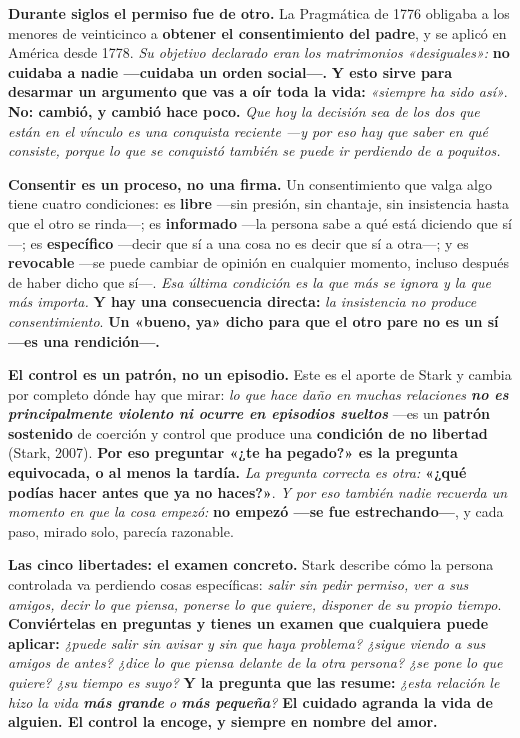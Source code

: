 \documentclass[11pt,letterpaper]{article}
\newcommand{\milcpaso}[3]{%
\Needspace{4\baselineskip}%
\begin{tcolorbox}[enhanced,colback=white,colframe=milcLinea,arc=1.5mm,boxrule=.9pt,
  left=14mm,right=4mm,top=3mm,bottom=3mm,before skip=4pt,after skip=4pt,
  fontupper=\RaggedRight,
  overlay={\node[anchor=north west,circle,fill=#2,text=white,inner sep=0pt,
    minimum size=7.4mm,font=\sffamily\bfseries\small]
    at ([xshift=3.6mm,yshift=-3.2mm]frame.north west) {#1};}]
#3
\end{tcolorbox}}
\begin{document}
\milcpaso{1}{milcTurquesa}{\textbf{Durante siglos el permiso fue de otro.} La Pragmática de 1776 obligaba a los menores de veinticinco a \textbf{obtener el consentimiento del padre}, y se aplicó en América desde 1778. \emph{Su objetivo declarado eran los matrimonios «desiguales»:} \textbf{no cuidaba a nadie ---cuidaba un orden social---.} \textbf{Y esto sirve para desarmar un argumento que vas a oír toda la vida:} \emph{«siempre ha sido así»}. \textbf{No: cambió, y cambió hace poco.} \emph{Que hoy la decisión sea de los dos que están en el vínculo es una conquista reciente ---y por eso hay que saber en qué consiste, porque lo que se conquistó también se puede ir perdiendo de a poquitos.}}
\milcpaso{2}{milcTurquesa}{\textbf{Consentir es un proceso, no una firma.} Un consentimiento que valga algo tiene cuatro condiciones: es \textbf{libre} ---sin presión, sin chantaje, sin insistencia hasta que el otro se rinda---; es \textbf{informado} ---la persona sabe a qué está diciendo que sí---; es \textbf{específico} ---decir que sí a una cosa no es decir que sí a otra---; y es \textbf{revocable} ---se puede cambiar de opinión en cualquier momento, incluso después de haber dicho que sí---. \emph{Esa última condición es la que más se ignora y la que más importa.} \textbf{Y hay una consecuencia directa:} \emph{la insistencia no produce consentimiento}. \textbf{Un «bueno, ya» dicho para que el otro pare no es un sí ---es una rendición---.}}
\milcpaso{3}{milcTurquesa}{\textbf{El control es un patrón, no un episodio.} Este es el aporte de Stark y cambia por completo dónde hay que mirar: \emph{lo que hace daño en muchas relaciones \textbf{no es principalmente violento ni ocurre en episodios sueltos}} ---es un \textbf{patrón sostenido} de coerción y control que produce una \textbf{condición de no libertad} (Stark, 2007). \textbf{Por eso preguntar «¿te ha pegado?» es la pregunta equivocada, o al menos la tardía.} \emph{La pregunta correcta es otra:} \textbf{«¿qué podías hacer antes que ya no haces?»}. \emph{Y por eso también nadie recuerda un momento en que la cosa empezó:} \textbf{no empezó ---se fue estrechando---}, y cada paso, mirado solo, parecía razonable.}
\milcpaso{4}{milcTurquesa}{\textbf{Las cinco libertades: el examen concreto.} Stark describe cómo la persona controlada va perdiendo cosas específicas: \emph{salir sin pedir permiso, ver a sus amigos, decir lo que piensa, ponerse lo que quiere, disponer de su propio tiempo}. \textbf{Conviértelas en preguntas y tienes un examen que cualquiera puede aplicar:} \emph{¿puede salir sin avisar y sin que haya problema? ¿sigue viendo a sus amigos de antes? ¿dice lo que piensa delante de la otra persona? ¿se pone lo que quiere? ¿su tiempo es suyo?} \textbf{Y la pregunta que las resume:} \emph{¿esta relación le hizo la vida \textbf{más grande} o \textbf{más pequeña}?} \textbf{El cuidado agranda la vida de alguien. El control la encoge, y siempre en nombre del amor.}}
\end{document}
